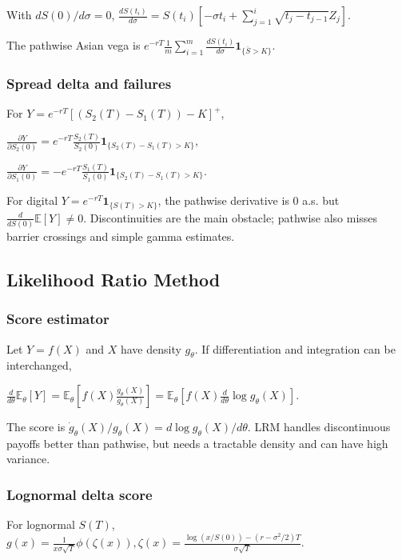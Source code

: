 With $dS(0)/d\sigma=0$,
$\frac{dS(t_i)}{d\sigma}=S(t_i)\left[-\sigma t_i+\sum_{j=1}^i\sqrt{t_j-t_{j-1}}Z_j\right]$.

The pathwise Asian vega is
$e^{-rT}\frac1m\sum_{i=1}^m\frac{dS(t_i)}{d\sigma}\mathbf{1}_{\{\bar S>K\}}$.

\subsubsection*{Spread delta and failures}

For $Y=e^{-rT}[(S_2(T)-S_1(T))-K]^+$,

$\frac{\partial Y}{\partial S_2(0)}=e^{-rT}\frac{S_2(T)}{S_2(0)}\mathbf{1}_{\{S_2(T)-S_1(T)>K\}}$,

$\frac{\partial Y}{\partial S_1(0)}=-e^{-rT}\frac{S_1(T)}{S_1(0)}\mathbf{1}_{\{S_2(T)-S_1(T)>K\}}$.

For digital $Y=e^{-rT}\mathbf{1}_{\{S(T)>K\}}$, the pathwise derivative is $0$ a.s. but $\frac{d}{dS(0)}\mathbb{E}[Y]\ne0$. Discontinuities are the main obstacle; pathwise also misses barrier crossings and simple gamma estimates.

\subsection{Likelihood Ratio Method}

\subsubsection*{Score estimator}

Let $Y=f(X)$ and $X$ have density $g_\theta$. If differentiation and integration can be interchanged,

$\frac{d}{d\theta}\mathbb{E}_\theta[Y]=\mathbb{E}_\theta\left[f(X)\frac{\dot g_\theta(X)}{g_\theta(X)}\right]=\mathbb{E}_\theta\left[f(X)\frac{d}{d\theta}\log g_\theta(X)\right]$.

The score is $\dot g_\theta(X)/g_\theta(X)=d\log g_\theta(X)/d\theta$. LRM handles discontinuous payoffs better than pathwise, but needs a tractable density and can have high variance.

\subsubsection*{Lognormal delta score}

For lognormal $S(T)$,
$g(x)=\frac{1}{x\sigma\sqrt T}\phi(\zeta(x)),\zeta(x)=\frac{\log(x/S(0))-(r-\sigma^2/2)T}{\sigma\sqrt T}$.

